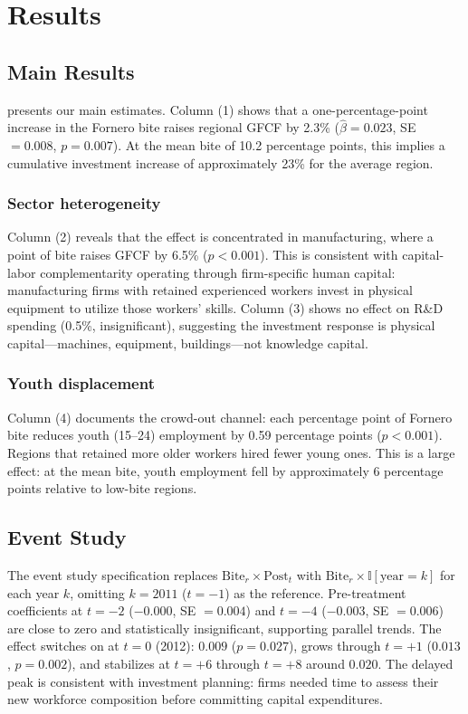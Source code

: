 \documentclass[12pt]{article}
\newcommand{\ind}{\mathbb{I}}
\begin{document}
\section{Results}

\subsection{Main Results}



 presents our main estimates. Column (1) shows that a one-percentage-point increase in the Fornero bite raises regional GFCF by 2.3\% ($\hat{\beta} = 0.023$, SE $= 0.008$, $p = 0.007$). At the mean bite of 10.2 percentage points, this implies a cumulative investment increase of approximately 23\% for the average region.

\subsubsection*{Sector heterogeneity} Column (2) reveals that the effect is concentrated in manufacturing, where a point of bite raises GFCF by 6.5\% ($p < 0.001$). This is consistent with capital-labor complementarity operating through firm-specific human capital: manufacturing firms with retained experienced workers invest in physical equipment to utilize those workers' skills. Column (3) shows no effect on R\&D spending (0.5\%, insignificant), suggesting the investment response is physical capital---machines, equipment, buildings---not knowledge capital.

\subsubsection*{Youth displacement} Column (4) documents the crowd-out channel: each percentage point of Fornero bite reduces youth (15--24) employment by 0.59 percentage points ($p < 0.001$). Regions that retained more older workers hired fewer young ones. This is a large effect: at the mean bite, youth employment fell by approximately 6 percentage points relative to low-bite regions.

\subsection{Event Study}

The event study specification replaces $\text{Bite}_r \times \text{Post}_t$ with $\text{Bite}_r \times \ind[\text{year} = k]$ for each year $k$, omitting $k = 2011$ ($t = -1$) as the reference. Pre-treatment coefficients at $t = -2$ ($-0.000$, SE $= 0.004$) and $t = -4$ ($-0.003$, SE $= 0.006$) are close to zero and statistically insignificant, supporting parallel trends. The effect switches on at $t = 0$ (2012): $0.009$ ($p = 0.027$), grows through $t = +1$ ($0.013$, $p = 0.002$), and stabilizes at $t = +6$ through $t = +8$ around $0.020$. The delayed peak is consistent with investment planning: firms needed time to assess their new workforce composition before committing capital expenditures.
\end{document}
